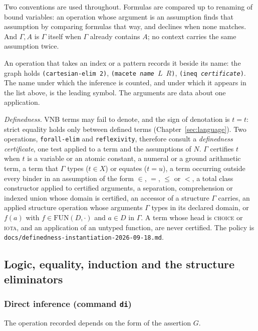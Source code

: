 Two conventions are used throughout.  Formulas are compared up to
renaming of bound variables: an operation whose argument is an
assumption finds that assumption by comparing formulas that way, and
declines when none matches.  And $\Gamma, A$ is $\Gamma$ itself when
$\Gamma$ already contains $A$; no context carries the same assumption
twice.

An operation that takes an index or a pattern records it beside its
name: the graph holds \texttt{(cartesian-elim 2)}, \texttt{(macete
\textit{name} $L$ $R$)}, \texttt{(ineq \textit{certificate})}.  The name under which the inference is counted, and under which
it appears in the list above, is the leading symbol.  The arguments are
data about one application.

\emph{Definedness.}  VNB terms may fail to denote, and the sign of
denotation is $t = t$: strict equality holds only between defined terms
(Chapter~\ref{sec:language}).  Two operations, \texttt{forall-elim}
and \texttt{reflexivity}, therefore consult a \emph{definedness
certificate}, one test applied to a term and the assumptions of $N$.
$\Gamma$ certifies $t$ when $t$ is a variable or an atomic constant, a
numeral or a ground arithmetic term, a term that $\Gamma$ types
($t \in X$) or equates ($t = u$), a term occurring outside every binder
in an assumption of the form $\in$, $=$, $\leq$ or $<$, a total class
constructor applied to certified arguments, a separation, comprehension
or indexed union whose domain is certified, an accessor of a structure
$\Gamma$ carries, an applied structure operation whose arguments
$\Gamma$ types in its declared domain, or $f(a)$ with $f \in
\mathrm{FUN}(D, \cdot)$ and $a \in D$ in $\Gamma$.  A term whose head is
\textsc{choice} or \textsc{iota}, and an application of an untyped
function, are never certified.  The policy is
\texttt{docs/definedness-instantiation-2026-09-18.md}.

\subsection{Logic, equality, induction and the structure eliminators}

\subsubsection*{Direct inference (command \texttt{di})}

The operation recorded depends on the form of the assertion $G$.

